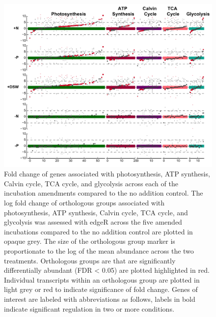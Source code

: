 \begin{figure}[p!]

  \centering
  \includegraphics[width=1\textwidth]{Images/C6_FigureS7_MckewATP.pdf}
    \caption[Fold change of genes associated with photosynthesis, ATP synthesis, Calvin cycle, TCA cycle, and glycolysis across each of the incubation amendments]{Fold change of genes associated with photosynthesis, ATP synthesis, Calvin cycle, TCA cycle, and glycolysis across each of the incubation amendments compared to the no addition control. The log fold change of orthologous groups associated with photosynthesis, ATP synthesis, Calvin cycle, TCA cycle, and glycolysis was assessed with edgeR across the five amended incubations compared to the no addition control are plotted in opaque grey. The size of the orthologous group marker is proportionate to the log of the mean abundance across the two treatments. Orthologous groups are that are significantly differentially abundant (FDR < 0.05) are plotted highlighted in red. Individual transcripts within an orthologous group are plotted in light grey or red to indicate significance of fold change. Genes of interest are labeled with abbreviations as follows, labels in bold indicate significant regulation in two or more conditions. }
    \label{fig:a5f7}
\end{figure}


